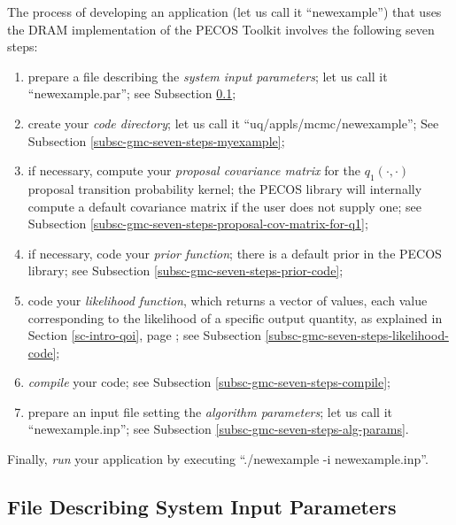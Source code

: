 The process of developing an application (let us call it ``newexample'') 
that uses the DRAM implementation of the PECOS Toolkit involves the following seven steps:
\begin{enumerate}
\item prepare a file describing the {\it system input parameters}; let us call it ``newexample.par''; see Subsection \ref{subsc-gmc-seven-steps-sys-input-params};
\item create your {\it code directory}; let us call it ``uq/appls/mcmc/newexample''; See Subsection \ref{subsc-gmc-seven-steps-myexample};
\item if necessary, compute your {\it proposal covariance matrix} for the $q_1(\cdot,\cdot)$ proposal transition probability kernel; the PECOS library will internally compute a default covariance matrix if the user does not supply one; see Subsection \ref{subsc-gmc-seven-steps-proposal-cov-matrix-for-q1};
\item if necessary, code your {\it prior function}; there is a default prior in the PECOS library; see Subsection \ref{subsc-gmc-seven-steps-prior-code};
\item code your {\it likelihood function}, which returns a vector of values, each value corresponding to the likelihood of a specific output quantity, as explained in Section \ref{sc-intro-qoi}, page \pageref{sc-intro-qoi}; see Subsection \ref{subsc-gmc-seven-steps-likelihood-code};
\item {\it compile} your code; see Subsection \ref{subsc-gmc-seven-steps-compile};
\item prepare an input file setting the {\it algorithm parameters}; let us call it ``newexample.inp''; see Subsection \ref{subsc-gmc-seven-steps-alg-params}.
\end{enumerate}
Finally, {\it run} your application by executing ``./newexample -i newexample.inp''.

\subsection{File Describing System Input Parameters}\label{subsc-gmc-seven-steps-sys-input-params}

